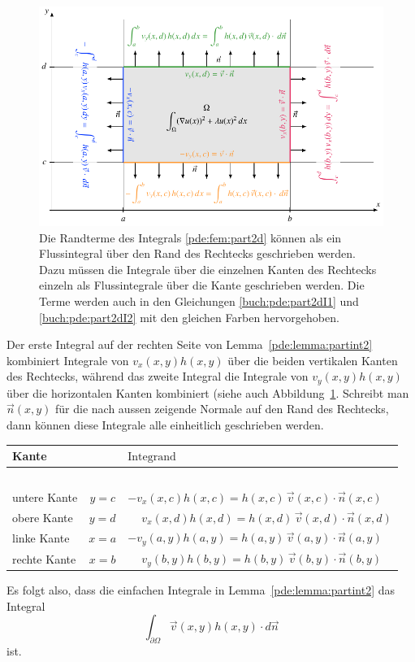 \begin{figure}
\centering
\includegraphics{chapters/70-pde/images/2dpart.pdf}
\caption{Die Randterme des Integrals \eqref{pde:fem:part2d}  können
als ein Flussintegral über den Rand des Rechtecks geschrieben werden.
Dazu müssen die Integrale über die einzelnen Kanten des Rechtecks einzeln
als Flussintegrale über die Kante geschrieben werden.
Die Terme werden auch in den Gleichungen
\eqref{buch:pde:part2dI1} und \eqref{buch:pde:part2dI2}
mit den gleichen Farben hervorgehoben.
\label{buch:pde:pfadintegral}}
\end{figure}
Der erste Integral auf der rechten Seite von Lemma~\ref{pde:lemma:partint2}
kombiniert Integrale von $v_x(x,y) h(x,y)$ über die beiden vertikalen Kanten 
des Rechtecks, während das zweite Integral die Integrale von
$v_y(x,y)h(x,y)$ über die horizontalen Kanten kombiniert (siehe auch
Abbildung~\ref{buch:pde:pfadintegral}.
Schreibt man $\vec{n}(x,y)$ für die nach aussen zeigende Normale auf den Rand 
des Rechtecks, dann können diese Integrale alle einheitlich geschrieben
werden.
\begin{center}
\begin{tabular}{l >{$}c<{$} >{$}l<{$}}
Kante& &\text{Integrand}
\\[2pt]
\hline
\\[-7pt]
\color{orange}untere Kante
	&y=c
	&         - v_x(x,c)h(x,c) = h(x,c) \, \vec{v}(x,c) \cdot \vec{n}(x,c)
\\[4pt]
\color{gruen}obere Kante
	&y=d
	&\phantom{-}v_x(x,d)h(x,d) = h(x,d) \, \vec{v}(x,d) \cdot \vec{n}(x,d)
\\[4pt]
\color{azure}linke Kante
	&x=a
	&         - v_y(a,y)h(a,y) = h(a,y) \, \vec{v}(a,y) \cdot \vec{n}(a,y)
\\[4pt]
\color{magenta}rechte Kante
	&x=b
 	&\phantom{-}v_y(b,y)h(b,y) = h(b,y) \, \vec{v}(b,y) \cdot \vec{n}(b,y)
\\[4pt]
\hline
\end{tabular}
\end{center}
Es folgt also, dass die einfachen Integrale in 
Lemma~\ref{pde:lemma:partint2} das Integral
\[
\int_{\partial\Omega} \vec{v}(x,y) h(x,y) \cdot d\vec{n}
\]
ist.

